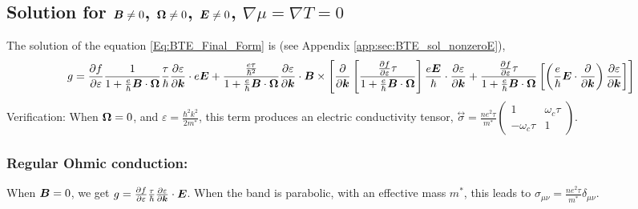 \documentclass{report}
\renewcommand\vec[1]{\ensuremath\boldsymbol{#1}} %
\begin{document}

\subsection{Solution for $\vec{B}\neq0$, $\vec{\Omega}\neq 0$, $\vec{E} \neq 0$, $\nabla \mu = \nabla T = 0$}
The solution of the equation \eqref{Eq:BTE_Final_Form} is (see Appendix \ref{app:sec:BTE_sol_nonzeroE}),
\begin{equation}\label{Eq:gnonzeroE}
	g = \frac{\partial f} {\partial \varepsilon}\frac{1}{1 + \frac{e}{\hbar} \vec{B}\cdot\vec{\Omega}}
	\frac{\tau}{\hbar} \frac{\partial \varepsilon}{\partial \vec{k}}\cdot e \vec{E} + \frac{\frac{e \tau}{\hbar^2} }{1 + \frac{e}{\hbar} \vec{B}\cdot\vec{\Omega}} \frac{\partial \varepsilon}{\partial \vec{k}} \cdot \vec{B} \times \left[ \frac{\partial}{\partial \vec{k}} \left[ \frac{\frac{\partial f} {\partial \varepsilon} \tau}{1 + \frac{e}{\hbar} \vec{B}\cdot\vec{\Omega}}
	\right] \frac{e \vec{E}}{\hbar} \cdot \frac{\partial \varepsilon}{\partial \vec{k}} + \frac{\frac{\partial f} {\partial \varepsilon} \tau}{1 + \frac{e}{\hbar} \vec{B}\cdot\vec{\Omega}} \left[\left(\frac{e}{\hbar} \vec{E}\cdot \frac{\partial }{\partial \vec{k}} \right)\frac{\partial \varepsilon}{\partial \vec{k}} \right] \right]
\end{equation}
Verification: When $\vec{\Omega} = 0$, and $\varepsilon = \frac{\hbar^2 k^2}{2 m^*}$, this term produces an electric conductivity tensor, $\stackrel{\leftrightarrow}{\sigma} = \frac{n e^2 \tau}{m^*} \begin{pmatrix}
	1 & \omega_c \tau \\
	-\omega_c \tau & 1 
\end{pmatrix}$.

\subsubsection{Regular Ohmic conduction:}\label{subsubsec:regularOhmic}
 When $\vec{B} = 0$, we get $ g = \frac{\partial f} {\partial \varepsilon}
\frac{\tau}{\hbar} \frac{\partial \varepsilon}{\partial \vec{k}}\cdot  \vec{E}
$. When the band is parabolic, with an effective mass $m^*$, this leads to $\sigma_{\mu \nu} = \frac{n e^2 \tau}{m^*} \delta_{\mu \nu}$.
\end{document}
